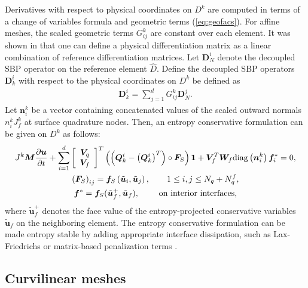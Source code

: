 \documentclass[review]{siamart0216}
\theoremstyle{assumption}
\renewcommand{\hat}[1]{\hat{#1}}
\newcommand{\pd}[2]{\frac{\partial#1}{\partial#2}}
\newcommand{\LRp}[1]{\left( #1 \right)}
\newcommand{\LRs}[1]{\left[ #1 \right]}
\renewcommand{\hat}{\widehat}
\newcommand{\diag}[1]{{\rm diag}\LRp{#1}}
\begin{document}
Derivatives with respect to physical coordinates on $D^k$ are computed in terms of a change of variables formula and geometric terms (\ref{eq:geofacs}).  For affine meshes, the scaled geometric terms ${G}^k_{ij}$ are constant over each element.  It was shown in \cite{chan2017discretely} that one can define a physical differentiation matrix as a linear combination of reference differentiation matrices.  Let ${\bm{D}}^i_N$ denote the decoupled SBP operator on the reference element $\hat{D}$.  Define the decoupled SBP operators $\bm{D}^i_k$ with respect to the physical coordinates on $D^k$ be defined as
\begin{align}
{\bm{D}}^i_k = \sum_{j=1}^d {G}^k_{ij}{\bm{D}}^j_N.
\end{align}
Let $\bm{n}^k_i$ be a vector containing concatenated values of the scaled outward normals $n^k_iJ^k_f$ at surface quadrature nodes.  
Then, an entropy conservative formulation can be given on $D^k$ as follows:
\begin{gather}
J^k\bm{M}\pd{\bm{u}}{t} + 
\sum_{i=1}^d \LRs{\begin{array}{cc}
\bm{V}_q \\
\bm{V}_f\end{array}}^T \LRp{\LRp{\bm{Q}^i_k - \LRp{\bm{Q}^i_k}^T} \circ \bm{F}_S}\bm{1} + \bm{V}_f^T\bm{W}_f \diag{{\bm{n}^k_i}}\bm{f}_i^* = 0, \label{eq:skewform}\\
\LRp{\bm{F}_S}_{ij} = \bm{f}_S\LRp{\tilde{\bm{u}}_i,\tilde{\bm{u}}_j}, \qquad 1\leq i,j\leq N_q + N^f_q, \nonumber\\
\bm{f}^* = \bm{f}_S(\tilde{\bm{u}}_f^+,\tilde{\bm{u}}_f), \qquad \text{ on interior interfaces,} \nonumber
\end{gather}
where $\tilde{\bm{u}}_f^+$ denotes the face value of the entropy-projected conservative variables $\tilde{\bm{u}}_f$ on the neighboring element.  The entropy conservative formulation can be made entropy stable by adding appropriate interface dissipation, such as Lax-Friedrichs or matrix-based penalization terms \cite{winters2017uniquely, chen2017entropy, chan2017discretely}.  

\subsection{Curvilinear meshes}
\end{document}
